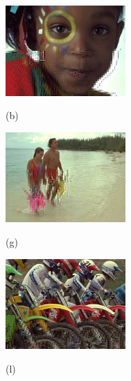 \begin{figure}[!]
		\begin{minipage}[t]{.32\linewidth}
			\includegraphics[width=1.8in]{TID/i15_12_4.jpg}
			\centerline{(b)}
		\end{minipage}
		\begin{minipage}[t]{.32\linewidth}
			\includegraphics[width=1.8in]{TID/i12_12_4.jpg}
			\centerline{(g)}
		\end{minipage}
		\begin{minipage}[t]{.32\linewidth}
			\includegraphics[width=1.8in]{TID/i05_12_4.jpg}
			\centerline{(l)}
		\end{minipage}
	

\end{figure}
